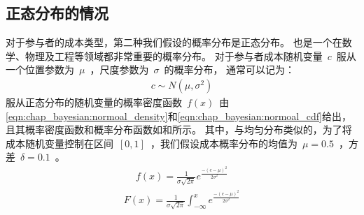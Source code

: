 \subsection{正态分布的情况}
对于参与者的成本类型，第二种我们假设的概率分布是正态分布。
也是一个在数学、物理及工程等领域都非常重要的概率分布。
对于参与者成本随机变量~$c$~服从一个位置参数为~$\mu$~，尺度参数为~$\sigma$~的概率分布，
通常可以记为：
\begin{align*}
    c \sim N(\mu, \sigma^2)
\end{align*}
服从正态分布的随机变量的概率密度函数~$f(x)$~由\eqref{eqn:chap_bayesian:normoal_density}和\eqref{eqn:chap_bayesian:normoal_cdf}给出，
且其概率密度函数和概率分布函数如和所示。
其中，与均匀分布类似的，为了将成本随机变量控制在区间~$[0,1]$~，我们假设成本概率分布的均值为~$\mu = 0.5$~，方差~$\delta = 0.1$~。
\begin{align}
    f(x) = \frac{1}{\sigma \sqrt{2\pi} } e^{ \frac{-(c-\mu)^2}{2\sigma^2}}
    \label{eqn:chap_bayesian:normoal_density}
\end{align}
\begin{align}
    F(x) = \frac{1}{\sigma \sqrt{2\pi} } \int^x_{-\infty}e^{ \frac{-(c-\mu)^2}{2\sigma^2}}
    \label{eqn:chap_bayesian:normoal_cdf}
\end{align}
